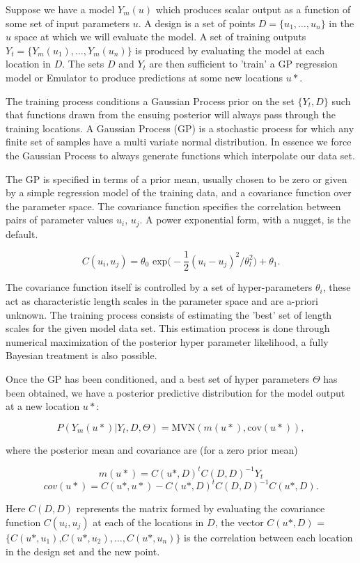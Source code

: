 \documentclass{article}
\begin{document}
Suppose we have a model $Y_m(u)$ which produces scalar output as a
function of some set of input parameters $u$. A design is a set of
points $D = \{u_1, …, u_n\}$ in the $u$ space at which we will evaluate
the model. A set of training outputs $Y_t = \{Y_m(u_1), …, Y_m(u_n)\}$ is
produced by evaluating the model at each location in $D$. The sets $D$ and
$Y_t$ are then sufficient to 'train' a GP regression model or Emulator
to produce predictions at some new locations $u*$.

The training process conditions a Gaussian Process prior on the set
$\{Y_t, D\}$ such that functions drawn from the ensuing posterior will
always pass through the training locations. A Gaussian Process (GP) is
a stochastic process for which any finite set of samples have a multi
variate normal distribution. In essence we force the Gaussian Process
to always generate functions which interpolate our data set.

The GP is specified in terms of a prior mean, usually chosen to be
zero or given by a simple regression model of the training data, and a
covariance function over the parameter space. The covariance function
specifies the correlation between pairs of parameter values $u_i$,
$u_j$. A power exponential form, with a nugget, is the default.

\[C(u_i, u_j) = θ_0 \textrm{~exp}\big(-\frac{1}{2} ( u_i - u_j)^2 / θ_l^2\big) + θ_1. \]

The covariance function itself is controlled by a set of
hyper-parameters $θ_i$, these act as characteristic length scales in
the parameter space and are a-priori unknown. The training process
consists of estimating the 'best' set of length scales for the given
model data set. This estimation process is done through numerical
maximization of the posterior hyper parameter likelihood, a fully
Bayesian treatment is also possible.

Once the GP has been conditioned, and a best set of hyper parameters
$Θ$ has been obtained, we have a posterior predictive distribution
for the model output at a new location $u*$:

\[P(Y_m(u*) | Y_t, D, Θ) = \textrm{MVN}(m(u*), \textrm{cov}(u*)), \]

where the posterior mean and covariance are (for a zero prior mean)

\[m(u*) = C(u*,D)^t  C(D,D)^{-1} Y_t\]
\[cov(u*) = C(u*,u*) - C(u*,D)^t C(D,D)^{-1} C(u*,D).\]

Here $C(D,D)$ represents the matrix formed by evaluating the covariance
function $C(u_i, u_j)$ at each of the locations in $D$, the vector
$C(u*,D)$ =  $\{C(u*, u_1)$,$C(u*, u_2), …, $$C(u*, u_n)\}$ is the correlation
between each location in the design set and the new point.
\end{document}
